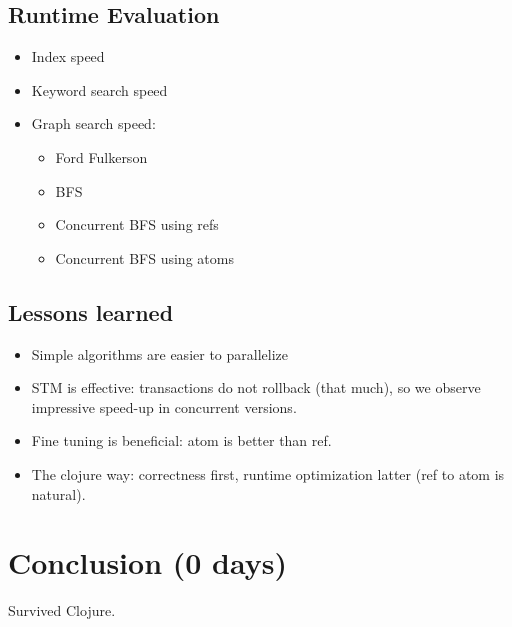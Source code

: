 \documentclass[grad]{uoit-thesis}
\begin{document}
		\section{Runtime Evaluation}
			\begin{itemize}
				\item Index speed
				\item Keyword search speed
				\item Graph search speed:
					\begin{itemize}
						\item Ford Fulkerson
						\item BFS
						\item Concurrent BFS using refs
						\item Concurrent BFS using atoms
					\end{itemize}
			\end{itemize}

		\section{Lessons learned}
			\begin{itemize}
				\item Simple algorithms are easier to parallelize
				\item STM is effective: transactions do not rollback (that much), so we observe impressive speed-up in concurrent versions.
				\item Fine tuning is beneficial: atom is better than ref.
				\item The clojure way: correctness first, runtime optimization latter (ref to atom is natural).
			\end{itemize}

			\chapter{Conclusion (0 days)}
				Survived Clojure.

	\appendix
	
	\begin{singlespaced}
		
	\end{singlespaced}
	
	\printbibliography
	
	\todos
\end{document}
